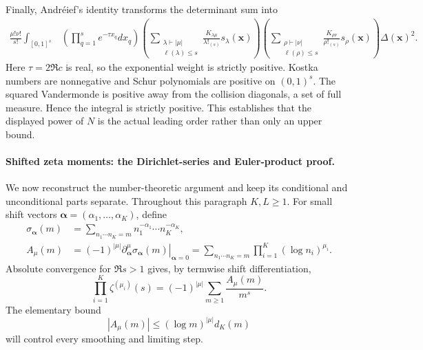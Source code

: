 Finally, Andr\'eief's identity
\cite[Sec.~5.1, lemma labelled ``Andr\'eief identity'']{simmWei2026} transforms the determinant sum into
\begin{align}
 \frac{\mu!\nu!}{s!}\int_{[0,1]^s}
 &\left(\prod_{q=1}^{s}e^{-\tau x_q}dx_q\right)
 \left(\sum_{\substack{\lambda\vdash|\mu|\\\ell(\lambda)\leq s}}
 \frac{K_{\lambda\mu}}{\lambda!_{(s)}}s_\lambda(\mathbf x)\right)
 \left(\sum_{\substack{\rho\vdash|\nu|\\\ell(\rho)\leq s}}
 \frac{K_{\rho\nu}}{\rho!_{(s)}}s_\rho(\mathbf x)\right)
 \Delta(\mathbf x)^2.
 \label{eq:GMS-audit-positive-integral}
\end{align}
Here $\tau=2\Re c$ is real, so the exponential weight is strictly positive.  Kostka numbers
are nonnegative and Schur polynomials are positive on $(0,1)^s$.  The squared Vandermonde is
positive away from the collision diagonals, a set of full measure.  Hence the integral is
strictly positive.  This establishes that the displayed power of $N$ is the actual leading
order rather than only an upper bound.

\paragraph{Shifted zeta moments: the Dirichlet-series and Euler-product proof.}
We now reconstruct the number-theoretic argument and keep its conditional and unconditional
parts separate.  Throughout this paragraph $K,L\geq1$.  For small shift vectors
$\boldsymbol\alpha=(\alpha_1,\ldots,\alpha_K)$, define
\begin{align}
 \sigma_{\boldsymbol\alpha}(m)
 &=\sum_{n_1\cdots n_K=m}n_1^{-\alpha_1}\cdots n_K^{-\alpha_K},
 \label{eq:GMS-audit-sigma-alpha}\\
 A_\mu(m)
 &=(-1)^{|\mu|}
 \left.\partial_{\boldsymbol\alpha}^{\mu}
 \sigma_{\boldsymbol\alpha}(m)\right|_{\boldsymbol\alpha=0}
 =\sum_{n_1\cdots n_K=m}
 \prod_{i=1}^{K}(\log n_i)^{\mu_i}.
 \label{eq:GMS-audit-A-mu}
\end{align}
Absolute convergence for $\Re s>1$ gives, by termwise shift differentiation,
\begin{equation}
 \prod_{i=1}^{K}\zeta^{(\mu_i)}(s)
 =(-1)^{|\mu|}\sum_{m\geq1}\frac{A_\mu(m)}{m^s}.
 \label{eq:GMS-audit-derivative-Dirichlet-series}
\end{equation}
The elementary bound
\begin{equation}
 |A_\mu(m)|\leq(\log m)^{|\mu|}d_K(m)
 \label{eq:GMS-audit-A-bound}
\end{equation}
will control every smoothing and limiting step.

